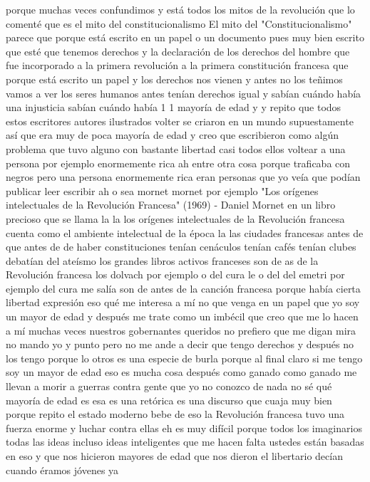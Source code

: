 porque muchas veces confundimos y está todos los mitos de la revolución que lo comenté que es el mito del constitucionalismo
El mito del "Constitucionalismo"
parece que porque está escrito en un papel o un documento pues muy bien escrito que esté que tenemos derechos y
la declaración de los derechos del hombre que fue incorporado a la primera revolución a la primera constitución francesa que porque está escrito un papel
y los derechos nos vienen y antes no los teñimos vamos a ver los seres humanos antes tenían derechos igual y sabían cuándo había una injusticia
sabían cuándo había 1 1 mayoría de edad y y repito que todos estos escritores autores ilustrados
volter se criaron en un mundo supuestamente así que era muy de poca mayoría de edad y creo que escribieron
como algún problema que tuvo alguno con bastante libertad casi todos ellos voltear a una persona por ejemplo enormemente rica
ah entre otra cosa porque traficaba con negros pero una persona enormemente rica
eran personas que yo veía que podían publicar leer escribir ah o sea mornet mornet por ejemplo
"Los orígenes intelectuales de la Revolución Francesa" (1969) - Daniel Mornet
en un libro precioso que se llama la la los orígenes intelectuales de la Revolución francesa cuenta como el ambiente intelectual de la época
la las ciudades francesas antes de que antes de de haber constituciones tenían cenáculos tenían cafés tenían clubes
debatían del ateísmo los grandes libros activos franceses son de as de la Revolución francesa los dolvach por ejemplo
o del cura le o del del emetri por ejemplo del cura me salía son de antes de la canción francesa porque había cierta libertad expresión
eso qué me interesa a mí no que venga en un papel que yo soy un mayor de edad y después me trate como un imbécil
que creo que me lo hacen a mí muchas veces nuestros gobernantes queridos no prefiero que me digan mira no mando yo y punto
pero no me ande a decir que tengo derechos y después no los tengo porque lo otros es una especie de burla porque al final claro
si me tengo soy un mayor de edad eso es mucha cosa después como ganado como ganado me llevan a morir a guerras
contra gente que yo no conozco de nada no sé qué mayoría de edad es esa es una retórica es una discurso que cuaja muy bien porque repito
el estado moderno bebe de eso la Revolución francesa tuvo una fuerza enorme y luchar contra ellas eh
es muy difícil porque todos los imaginarios todas las ideas incluso ideas inteligentes que me hacen falta ustedes
están basadas en eso y que nos hicieron mayores de edad que nos dieron el libertario decían cuando éramos jóvenes ya
